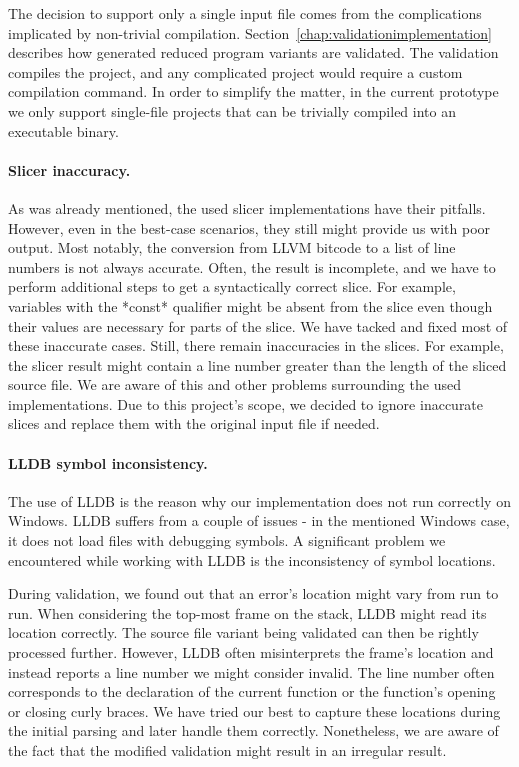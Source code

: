 The decision to support only a single input file comes from 
the complications implicated by non-trivial compilation. 
Section~\ref{chap:validationimplementation} describes how generated reduced 
program variants are validated. 
The validation compiles the project, and any complicated project would 
require a custom compilation command. 
In order to simplify the matter, in the current prototype we only support 
single-file projects that can be trivially compiled into an executable 
binary.

\paragraph{Slicer inaccuracy.}
As was already mentioned, the used slicer implementations have their 
pitfalls. 
However, even in the best-case scenarios, they still might provide us with 
poor output. 
Most notably, the conversion from LLVM bitcode to a list of line numbers is 
not always accurate. 
Often, the result is incomplete, and we have to perform additional steps to 
get a syntactically correct slice. 
For example, variables with the *const* qualifier might be absent from 
the slice even though their values are necessary for parts of the slice. 
We have tacked and fixed most of these inaccurate cases. 
Still, there remain inaccuracies in the slices. 
For example, the slicer result might contain a line number greater than 
the length of the sliced source file. 
We are aware of this and other problems surrounding the used implementations. 
Due to this project's scope, we decided to ignore inaccurate slices and 
replace them with the original input file if needed.

\paragraph{LLDB symbol inconsistency.}
The use of LLDB is the reason why our implementation does not run correctly 
on Windows. 
LLDB suffers from a couple of issues - in the mentioned Windows case, it does 
not load files with debugging symbols.
A significant problem we encountered while working with LLDB is 
the inconsistency of symbol locations. 

During validation, we found out that an error's location might vary from run 
to run. 
When considering the top-most frame on the stack, LLDB might read its 
location correctly. 
The source file variant being validated can then be rightly processed further. 
However, LLDB often misinterprets the frame's location and instead reports 
a line number we might consider invalid. 
The line number often corresponds to the declaration of the current function 
or the function's opening or closing curly braces. 
We have tried our best to capture these locations during the initial parsing 
and later handle them correctly. 
Nonetheless, we are aware of the fact that the modified validation might 
result in an irregular result.